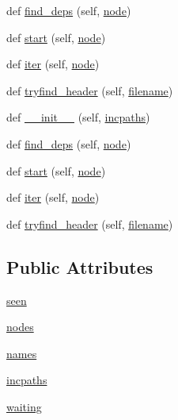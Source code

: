 \begin{DoxyCompactItemize}
def \hyperlink{classwaflib_1_1_tools_1_1fc__scan_1_1fortran__parser_a75f33cebf7d879d9a1bac1bbdffb006f}{find\+\_\+deps} (self, \hyperlink{structnode}{node})
\item 
def \hyperlink{classwaflib_1_1_tools_1_1fc__scan_1_1fortran__parser_a101c0766de664d1ea3f18c1207975d34}{start} (self, \hyperlink{structnode}{node})
\item 
def \hyperlink{classwaflib_1_1_tools_1_1fc__scan_1_1fortran__parser_ab684de9ae5dcf3a21da6d54a9492a2f7}{iter} (self, \hyperlink{structnode}{node})
\item 
def \hyperlink{classwaflib_1_1_tools_1_1fc__scan_1_1fortran__parser_a7b77b8d6d5dcb63f46aaaf8c52279160}{tryfind\+\_\+header} (self, \hyperlink{test__portburn_8cpp_a7efa5e9c7494c7d4586359300221aa5d}{filename})
\item 
def \hyperlink{classwaflib_1_1_tools_1_1fc__scan_1_1fortran__parser_a53c17dbafe5f1887eec6f5221fc19083}{\+\_\+\+\_\+init\+\_\+\+\_\+} (self, \hyperlink{classwaflib_1_1_tools_1_1fc__scan_1_1fortran__parser_a9ca545fb7876aab508df3fcb8c298f59}{incpaths})
\item 
def \hyperlink{classwaflib_1_1_tools_1_1fc__scan_1_1fortran__parser_a75f33cebf7d879d9a1bac1bbdffb006f}{find\+\_\+deps} (self, \hyperlink{structnode}{node})
\item 
def \hyperlink{classwaflib_1_1_tools_1_1fc__scan_1_1fortran__parser_a101c0766de664d1ea3f18c1207975d34}{start} (self, \hyperlink{structnode}{node})
\item 
def \hyperlink{classwaflib_1_1_tools_1_1fc__scan_1_1fortran__parser_ab684de9ae5dcf3a21da6d54a9492a2f7}{iter} (self, \hyperlink{structnode}{node})
\item 
def \hyperlink{classwaflib_1_1_tools_1_1fc__scan_1_1fortran__parser_a7b77b8d6d5dcb63f46aaaf8c52279160}{tryfind\+\_\+header} (self, \hyperlink{test__portburn_8cpp_a7efa5e9c7494c7d4586359300221aa5d}{filename})
\end{DoxyCompactItemize}
\subsection*{Public Attributes}
\begin{DoxyCompactItemize}
\item 
\hyperlink{classwaflib_1_1_tools_1_1fc__scan_1_1fortran__parser_a06b3374315e709b61857ca36a23f089d}{seen}
\item 
\hyperlink{classwaflib_1_1_tools_1_1fc__scan_1_1fortran__parser_a628851d346134580bc01cdfb125e8215}{nodes}
\item 
\hyperlink{classwaflib_1_1_tools_1_1fc__scan_1_1fortran__parser_a896761e3cd6373cd954645bcc0213f91}{names}
\item 
\hyperlink{classwaflib_1_1_tools_1_1fc__scan_1_1fortran__parser_a9ca545fb7876aab508df3fcb8c298f59}{incpaths}
\item 
\hyperlink{classwaflib_1_1_tools_1_1fc__scan_1_1fortran__parser_ac6cc09b2284709cb3bca0de459e13588}{waiting}
\end{DoxyCompactItemize}


